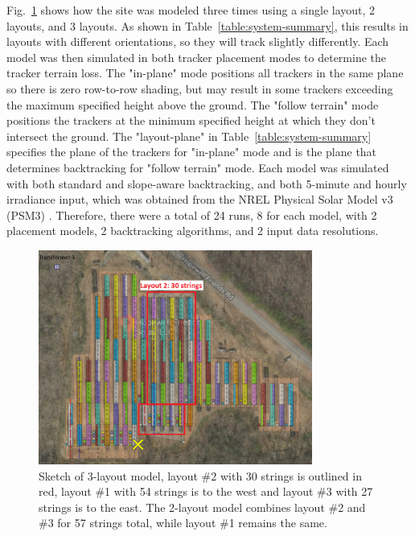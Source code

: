 \documentclass[conference]{IEEEtran}
\begin{document}
Fig.~\ref{fig:layouts} shows how the site was modeled three times using a single layout, 2 layouts, and 3 layouts. As shown in Table~\ref{table:system-summary}, this results in layouts with different orientations, so they will track slightly differently. Each model was then simulated in both tracker placement modes to determine the tracker terrain loss. The "in-plane" mode positions all trackers in the same plane so there is zero row-to-row shading, but may result in some trackers exceeding the maximum specified height above the ground. The "follow terrain" mode positions the trackers at the minimum specified height at which they don't intersect the ground. The "layout-plane" in Table~\ref{table:system-summary} specifies the plane of the trackers for "in-plane" mode and is the plane that determines backtracking for "follow terrain" mode. Each model was simulated with both standard \cite{Marion2013} and slope-aware \cite{Anderson2020} backtracking, and both 5-minute and hourly irradiance input, which was obtained from the NREL Physical Solar Model v3 (PSM3) \cite{Sengupta2018}. Therefore, there were a total of 24 runs, 8 for each model, with 2 placement models, 2 backtracking algorithms, and 2 input data resolutions.

\begin{figure}[htbp]
\centerline{\includegraphics[width=9cm]{layouts.png}}
\caption{Sketch of 3-layout model, layout \#2 with 30 strings is outlined in red, layout \#1 with 54 strings is to the west and layout \#3 with 27 strings is to the east. The 2-layout model combines layout \#2 and \#3 for 57 strings total, while layout \#1 remains the same.}
\label{fig:layouts}
\end{figure}
\end{document}
